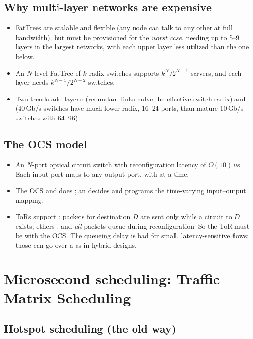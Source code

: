 \subsection{Why multi-layer networks are expensive}
\begin{itemize}
\item FatTrees are scalable and flexible (any node can talk to any other at full bandwidth), but must be provisioned for the \emph{worst case}, needing up to 5--9 layers in the largest networks, with each upper layer less utilized than the one below.
\item An $N$-level FatTree of $k$-radix switches supports $k^N/2^{N-1}$ servers, and each layer needs $k^{N-1}/2^{N-2}$ switches.
\item Two trends add layers:  (redundant links halve the effective switch radix) and  (40\,Gb/s switches have much lower radix, 16--24 ports, than mature 10\,Gb/s switches with 64--96).
\end{itemize}

\subsection{The OCS model}
\begin{itemize}
\item An $N$-port optical circuit switch with reconfiguration latency of $O(10)\,\mu$s. Each input port maps to any output port, with  at a time.
\item The OCS  and does ; an  decides and programs the time-varying input--output mapping.
\item ToRs support : packets for destination $D$ are sent only while a circuit to $D$ exists; others , and \emph{all} packets queue during reconfiguration. So the ToR must be  with the OCS. The queueing delay is bad for small, latency-sensitive flows; those can go over a  as in hybrid designs.
\end{itemize}

\section{Microsecond scheduling: Traffic Matrix Scheduling}
\subsection{Hotspot scheduling (the old way)}
